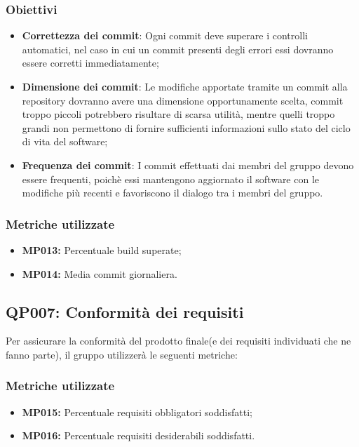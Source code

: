 \subsubsection{Obiettivi}
\begin{itemize}
	\item \textbf{Correttezza dei commit}: Ogni commit deve superare i controlli automatici, nel caso in cui un commit presenti degli errori  essi dovranno essere corretti immediatamente;
	\item \textbf{Dimensione dei commit}: Le modifiche apportate tramite un commit alla repository dovranno avere una dimensione opportunamente scelta, commit troppo piccoli potrebbero risultare di scarsa utilità, mentre quelli troppo grandi non permettono di fornire sufficienti informazioni sullo stato del ciclo di vita del software;
	\item  \textbf{Frequenza dei commit}: I commit effettuati dai membri del gruppo devono essere frequenti, poichè essi mantengono aggiornato il software con le modifiche più recenti e favoriscono il dialogo tra i membri del gruppo.
	
\end{itemize}
\subsubsection{Metriche utilizzate}
\begin{itemize}
	\item \textbf{MP013:} Percentuale build superate;
	\item \textbf{MP014:} Media commit giornaliera.
\end{itemize}

\subsection{QP007: Conformità dei requisiti}
Per assicurare la conformità del prodotto finale(e dei requisiti individuati che ne fanno parte), il gruppo utilizzerà le seguenti metriche:

\subsubsection{Metriche utilizzate}
\begin{itemize}
	\item \textbf{MP015:} Percentuale requisiti obbligatori soddisfatti;
	\item \textbf{MP016:} Percentuale requisiti desiderabili soddisfatti.
\end{itemize}

